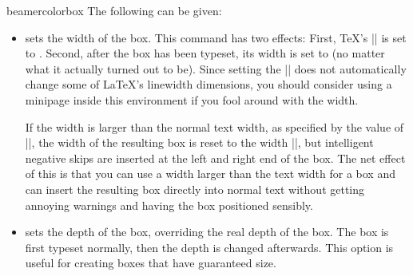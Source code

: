 \begin{environment}{{beamercolorbox}}
  The following  can be given:
  \begin{itemize}
  \item {} sets the width of the box. This
    command has two effects: First, \TeX's |\hsize| is set to
    . Second, after the box has been typeset, its width is
    set to  (no matter what it actually turned out to
    be). Since setting the |\hsize| does not automatically change some
    of \LaTeX's linewidth dimensions, you should consider using a
    minipage inside this environment if you fool around with the
    width.

    If the width is larger than the normal text width, as specified by
    the value of |\textwidth|, the width of the resulting box is reset
    to the width |\textwidth|, but intelligent negative skips are
    inserted at the left and right end of the box. The net effect of
    this is that you can use a width larger than the text width for a
    box and can insert the resulting box directly into normal text
    without getting annoying warnings and having the box positioned
    sensibly.
  \item {} sets the depth of the box,
    overriding the real depth of the box. The box is first typeset
    normally, then the depth is changed afterwards. This option is
    useful for creating boxes that have guaranteed size.


\end{itemize}
\end{environment}
